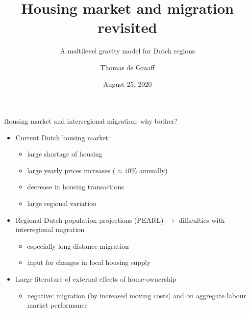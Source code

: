 \documentclass{beamer}
\title{Housing market and migration revisited}
\subtitle{A multilevel gravity model for Dutch regions}
\date{August 25, 2020}
\author{Thomas de Graaff}
\institute{Vrije Universiteit Amsterdam\\Tinbergen Institute Amsterdam}
\begin{document}
\maketitle


\begin{frame}{Housing market and interregional migration: why bother?}
   	\begin{itemize}
   		\item Current Dutch housing market:
   		\begin{itemize}
   			\item large \alert{shortage} of housing
   			\item large yearly prices \alert{increases} ($\approx 10\%$ annually)
   			\item decrease in housing \alert{transactions}
   			\item large \alert{regional} variation\newline \pause
   		\end{itemize}
            \item Regional Dutch population projections (PEARL)  $\longrightarrow$ difficulties with \alert{interregional} migration
            \begin{itemize}
            \item especially long-distance migration  
            \item input for changes in local housing supply \newline \pause
            \end{itemize}
   		\item Large literature of \alert{external} effects of home-ownership \footnotesize{\citep{dietz2003social}}
   		\begin{itemize}
   			\item \alert{negative}: migration (by increased moving costs) and on aggregate labour market performance \footnotesize{\citep{oswald1996conjecture,oswald1999housing}}
   		\end{itemize}
   	\end{itemize}
\end{frame}
\end{document}
